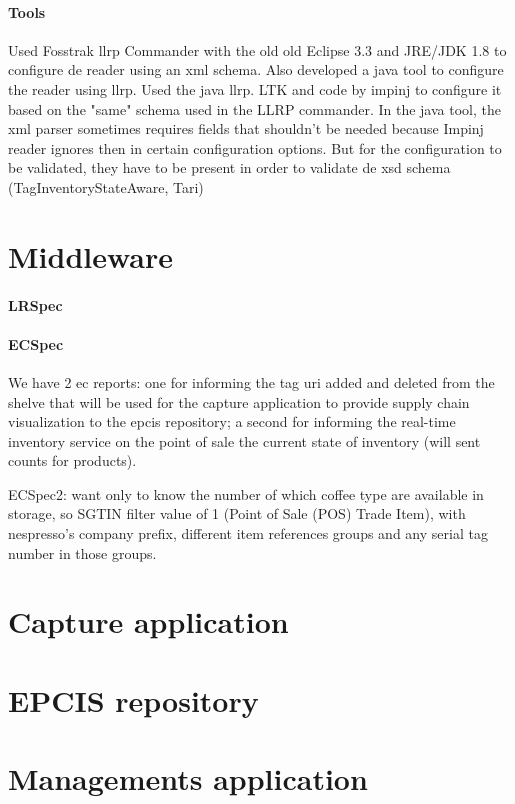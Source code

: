 \paragraph{Tools}

Used Fosstrak \ac{llrp} Commander with the old old Eclipse 3.3 and JRE/JDK 1.8 to configure de reader using an xml schema.
Also developed a java tool to configure the reader using \ac{llrp}. Used the java llrp. LTK and code by impinj to configure it based on the "same" schema used in the LLRP commander.
In the java tool, the xml parser sometimes requires fields that shouldn't be needed because Impinj reader ignores then in certain configuration options. But for the configuration to be validated, they have to be present in order to validate de xsd schema (TagInventoryStateAware, Tari)

\section{Middleware}

\paragraph{LRSpec}

\paragraph{ECSpec}

We have 2 ec reports: one for informing the tag uri added and deleted from the shelve that will be used for the capture application to provide supply chain visualization to the epcis repository; a second for informing the real-time inventory service on the point of sale the current state of inventory (will sent counts for products).

ECSpec2: want only to know the number of which coffee type are available in storage, so SGTIN filter value of 1 (Point of Sale (POS) Trade Item), with nespresso's company prefix, different item references groups and any serial tag number in those groups.


\section{Capture application}

\section{EPCIS repository}

\section{Managements application}